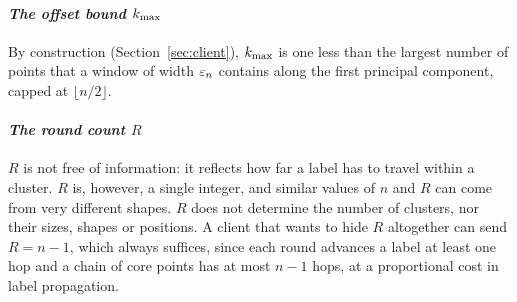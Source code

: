 \paragraph{\emph{The offset bound $k_{\max}$}}
By construction (Section~\ref{sec:client}), $k_{\max}$ is one less than the
largest number of points that a window of width $\varepsilon_n$ contains along the
first principal component, capped at $\lfloor n/2 \rfloor$.

\paragraph{\emph{The round count $R$}}
$R$ is not free of information: it reflects how far a label has to
travel within a cluster. $R$ is, however, a single integer, and similar
values of $n$ and $R$ can come from very different shapes. $R$ does not
determine the number of clusters, nor their sizes, shapes or positions.
A client that wants to hide $R$ altogether can send $R = n - 1$, which
always suffices, since each round advances a label at least one hop and a
chain of core points has at most $n - 1$ hops, at a proportional cost in
label propagation.